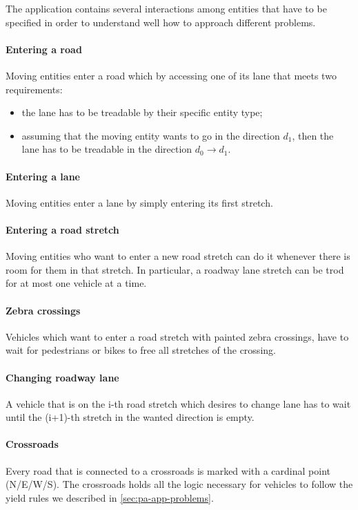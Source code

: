 
The application contains several interactions among entities that have to be
specified in order to understand well how to approach different problems.

\paragraph{Entering a road} Moving entities enter a road which by accessing
one of its lane that meets two requirements:

\begin{itemize}
  \item the lane has to be treadable by their specific entity type;
  \item assuming that the moving entity wants to go in the direction $d_1$,
    then the lane has to be treadable in the direction $d_0 \rightarrow d_1$.
\end{itemize}

\paragraph{Entering a lane}
Moving entities enter a lane by simply entering its first stretch.

\paragraph{Entering a road stretch}
Moving entities who want to enter a new road stretch
can do it whenever there is room for them in that stretch.
In particular, a roadway lane stretch can be trod for at most
one vehicle at a time.

\paragraph{Zebra crossings} Vehicles which want to enter a road stretch
with painted zebra crossings, have to wait for
pedestrians or bikes to free all stretches of the crossing.

\paragraph{Changing roadway lane} A vehicle that is on the i-th road stretch
which desires to change lane has to wait until the (i+1)-th stretch in the
wanted direction is empty.

\paragraph{Crossroads} Every road that is connected to a crossroads is marked
with a cardinal point (N/E/W/S). The crossroads holds all the logic necessary
for vehicles to follow the yield rules we described in
\ref{sec:pa-app-problems}.

